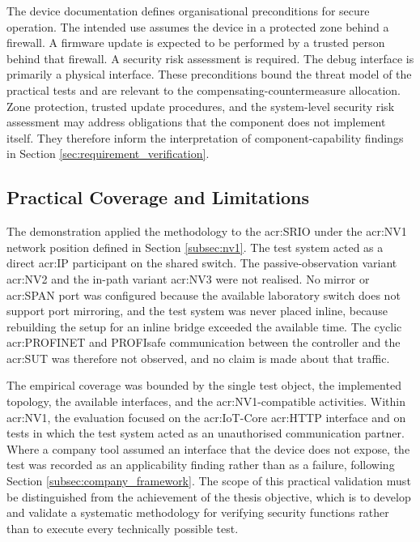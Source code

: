 The device documentation defines organisational preconditions for secure operation. The intended use assumes the device in a protected zone behind a firewall. A firmware update is expected to be performed by a trusted person behind that firewall. A security risk assessment is required. The debug interface is primarily a physical interface. These preconditions bound the threat model of the practical tests and are relevant to the compensating-countermeasure allocation. Zone protection, trusted update procedures, and the system-level security risk assessment may address obligations that the component does not implement itself. They therefore inform the interpretation of component-capability findings in Section \ref{sec:requirement_verification}.



\subsection{Practical Coverage and Limitations} 
\label{subsec:practical_scope} 

The demonstration applied the methodology to the \gls{acr:SRIO} under the \gls{acr:NV1} network position defined in Section \ref{subsec:nv1}. The test system acted as a direct \gls{acr:IP} participant on the shared switch. The passive-observation variant \gls{acr:NV2} and the in-path variant \gls{acr:NV3} were not realised. No mirror or \gls{acr:SPAN} port was configured because the available laboratory switch does not support port mirroring, and the test system was never placed inline, because rebuilding the setup for an inline bridge exceeded the available time. The cyclic \gls{acr:PROFINET} and PROFIsafe communication between the controller and the \gls{acr:SUT} was therefore not observed, and no claim is made about that traffic.

The empirical coverage was bounded by the single test object, the implemented topology, the available interfaces, and the \gls{acr:NV1}-compatible activities. Within \gls{acr:NV1}, the evaluation focused on the \gls{acr:IoT}-Core \gls{acr:HTTP} interface and on tests in which the test system acted as an unauthorised communication partner. Where a company tool assumed an interface that the device does not expose, the test was recorded as an applicability finding rather than as a failure, following Section \ref{subsec:company_framework}. The scope of this practical validation must be distinguished from the achievement of the thesis objective, which is to develop and validate a systematic methodology for verifying security functions rather than to execute every technically possible test.



